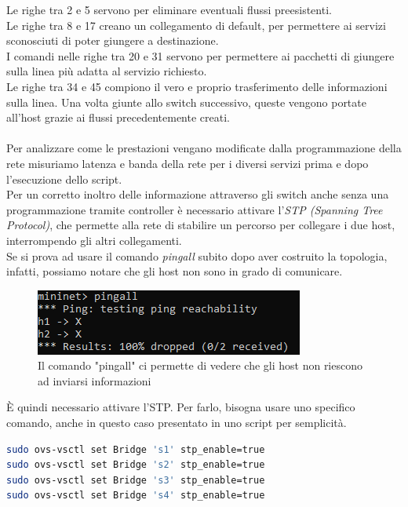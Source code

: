 Le righe tra 2 e 5 servono per eliminare eventuali flussi preesistenti.\\
Le righe tra 8 e 17 creano un collegamento di default, per permettere ai servizi sconosciuti di poter giungere a destinazione.\\
I comandi nelle righe tra 20 e 31 servono per permettere ai pacchetti di giungere sulla linea più adatta al servizio richiesto.\\
Le righe tra 34 e 45 compiono il vero e proprio trasferimento delle informazioni sulla linea. Una volta giunte allo switch successivo, queste vengono portate all'host grazie ai flussi precedentemente creati.\\\\
Per analizzare come le prestazioni vengano modificate dalla programmazione della rete misuriamo latenza e banda della rete per i diversi servizi prima e dopo l'esecuzione dello script.\\
Per un corretto inoltro delle informazione attraverso gli switch anche senza una programmazione tramite controller è necessario attivare l'\textit{STP (Spanning Tree Protocol)}, che permette alla rete di stabilire un percorso per collegare i due host, interrompendo gli altri collegamenti.\\
Se si prova ad usare il comando \textit{pingall} subito dopo aver costruito la topologia, infatti, possiamo notare che gli host non sono in grado di comunicare.\\
\begin{figure}[H]
	\centering
	\includegraphics[width=0.9\linewidth]{../immagini/esempio/stp_off}
	\caption[Pingall con STP disattivato]{Il comando "pingall" ci permette di vedere che gli host non riescono ad inviarsi informazioni}
	\label{fig:stpoff}
\end{figure}
È quindi necessario attivare l'STP. Per farlo, bisogna usare uno specifico comando, anche in questo caso presentato in uno script per semplicità.\\
\begin{lstlisting}[language=bash]
sudo ovs-vsctl set Bridge 's1' stp_enable=true
sudo ovs-vsctl set Bridge 's2' stp_enable=true
sudo ovs-vsctl set Bridge 's3' stp_enable=true
sudo ovs-vsctl set Bridge 's4' stp_enable=true
\end{lstlisting}
